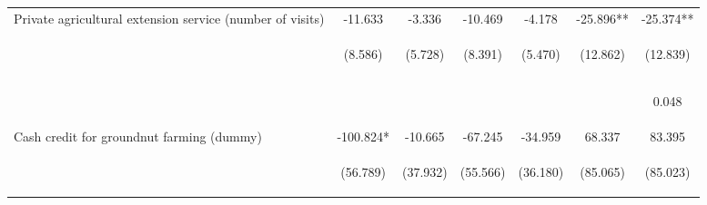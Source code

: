 \begin{center}
\begin{tabular}{lcccccc}
Private agricultural extension service (number of visits) & -11.633 & -3.336 & -10.469 & -4.178 & -25.896** & -25.374** \\
 & \begin{footnotesize}(8.586)\end{footnotesize} & \begin{footnotesize}(5.728)\end{footnotesize} & \begin{footnotesize}(8.391)\end{footnotesize} & \begin{footnotesize}(5.470)\end{footnotesize} & \begin{footnotesize}(12.862)\end{footnotesize} & \begin{footnotesize}(12.839)\end{footnotesize} \\
\vspace{4pt} & \begin{footnotesize}[0.175]\end{footnotesize} & \begin{footnotesize}[0.560]\end{footnotesize} & \begin{footnotesize}[0.212]\end{footnotesize} & \begin{footnotesize}[0.445]\end{footnotesize} & \begin{footnotesize}[0.044]\end{footnotesize} & \begin{footnotesize}0.048\end{footnotesize} \\
Cash credit for groundnut farming (dummy) & -100.824* & -10.665 & -67.245 & -34.959 & 68.337 & 83.395 \\
 & \begin{footnotesize}(56.789)\end{footnotesize} & \begin{footnotesize}(37.932)\end{footnotesize} & \begin{footnotesize}(55.566)\end{footnotesize} & \begin{footnotesize}(36.180)\end{footnotesize} & \begin{footnotesize}(85.065)\end{footnotesize} & \begin{footnotesize}(85.023)\end{footnotesize} \\

\end{tabular}
\end{center}

